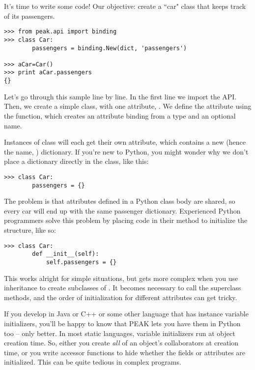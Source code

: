 It's time to write some code!  Our objective: create a ``car" class 
that keeps track of its passengers.

\begin{verbatim}
>>> from peak.api import binding
>>> class Car:
        passengers = binding.New(dict, 'passengers')
	
>>> aCar=Car()
>>> print aCar.passengers
{}

\end{verbatim}

Let's go through this sample line by line.  In the first line we import the
 API.  Then, we create a simple class, with one attribute,
.  We define the attribute using the 
function, which creates an attribute binding from a type and an optional name.

Instances of class  will each get their own 
attribute, which contains a new (hence the name, )
dictionary.  If you're new to Python, you might wonder why we don't place a
dictionary directly in the class, like this:

\begin{verbatim}
>>> class Car:
        passengers = {}

\end{verbatim}

The problem is that attributes defined in a Python class body are shared, so
every car will end up with the same passenger dictionary.  Experienced Python
programmers solve this problem by placing code in their 
method to initialize the structure, like so:



\begin{verbatim}
>>> class Car:
        def __init__(self):
            self.passengers = {}

\end{verbatim}

This works alright for simple situations, but gets more complex when you use
inheritance to create subclasses of .  It becomes necessary to
call the superclass  methods, and the order of initialization
for different attributes can get tricky.

If you develop in Java or C++ or some other language that has instance
variable initializers, you'll be happy to know that PEAK lets you have them
in Python too -- only better.  In most static languages, variable initializers
run at object creation time.  So, either you create \emph{all} of an object's
collaborators at creation time, or you write accessor functions to hide
whether the fields or attributes are initialized.  This can be quite tedious
in complex programs.

